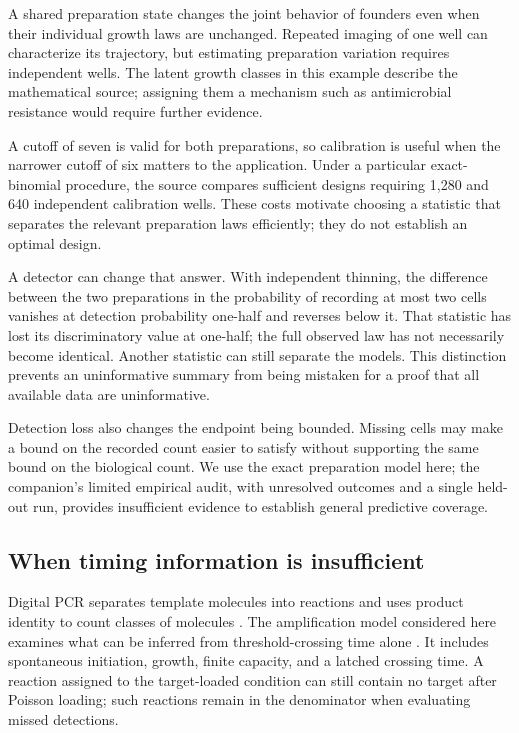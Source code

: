 \documentclass[11pt]{article}
\begin{document}
A shared preparation state changes the joint behavior of founders even when their individual growth laws are unchanged. Repeated imaging of one well can characterize its trajectory, but estimating preparation variation requires independent wells. The latent growth classes in this example describe the mathematical source; assigning them a mechanism such as antimicrobial resistance would require further evidence.

A cutoff of seven is valid for both preparations, so calibration is useful when the narrower cutoff of six matters to the application. Under a particular exact-binomial procedure, the source compares sufficient designs requiring 1,280 and 640 independent calibration wells. These costs motivate choosing a statistic that separates the relevant preparation laws efficiently; they do not establish an optimal design.

A detector can change that answer. With independent thinning, the difference between the two preparations in the probability of recording at most two cells vanishes at detection probability one-half and reverses below it. That statistic has lost its discriminatory value at one-half; the full observed law has not necessarily become identical. Another statistic can still separate the models. This distinction prevents an uninformative summary from being mistaken for a proof that all available data are uninformative.

Detection loss also changes the endpoint being bounded. Missing cells may make a bound on the recorded count easier to satisfy without supporting the same bound on the biological count. We use the exact preparation model here; the companion's limited empirical audit, with unresolved outcomes and a single held-out run, provides insufficient evidence to establish general predictive coverage.

\subsection{When timing information is insufficient}
Digital PCR separates template molecules into reactions and uses product identity to count classes of molecules \citep{vogelstein}. The amplification model considered here examines what can be inferred from threshold-crossing time alone \citep{A}. It includes spontaneous initiation, growth, finite capacity, and a latched crossing time. A reaction assigned to the target-loaded condition can still contain no target after Poisson loading; such reactions remain in the denominator when evaluating missed detections.
\end{document}
